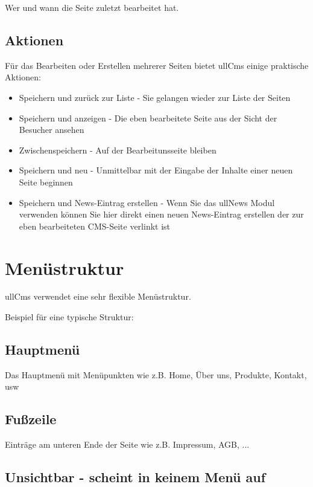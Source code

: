 \documentclass[article, a4paper, oneside, 11pt]{memoir}
\begin{document}
Wer und wann die Seite zuletzt bearbeitet hat.



\section{Aktionen}

Für das Bearbeiten oder Erstellen mehrerer Seiten bietet ullCms einige praktische Aktionen:

\begin{itemize}
\item Speichern und zurück zur Liste - Sie gelangen wieder zur Liste der Seiten
\item Speichern und anzeigen - Die eben bearbeitete Seite aus der Sicht der Besucher ansehen
\item Zwischenspeichern - Auf der Bearbeitunsseite bleiben
\item Speichern und neu - Unmittelbar mit der Eingabe der Inhalte einer neuen Seite beginnen
\item Speichern und News-Eintrag erstellen - Wenn Sie das ullNews Modul verwenden können Sie hier direkt einen neuen News-Eintrag erstellen der zur eben bearbeiteten CMS-Seite verlinkt ist
\end{itemize}





\chapter{Menüstruktur}

ullCms verwendet eine sehr flexible Menüstruktur. 

Beispiel für eine typische Struktur:

\section{Hauptmenü}

Das Hauptmenü mit Menüpunkten wie z.B. Home, Über uns, Produkte, Kontakt, usw


\section{Fußzeile}

Einträge am unteren Ende der Seite wie z.B. Impressum, AGB, ...

\section{Unsichtbar - scheint in keinem Menü auf}
\end{document}

